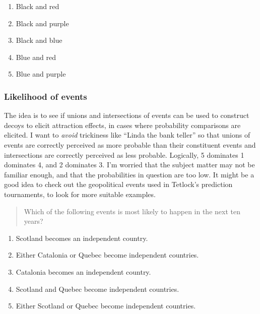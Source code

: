 \documentclass[11pt,letter]{amsart}
\begin{document}
\begin{enumerate}
\item Black and red 

\item Black and purple 

\item Black and blue 

\item Blue and red 

\item Blue and purple
\end{enumerate}

\subsubsection{Likelihood of events}

The idea is to see if unions and intersections of events can be used to
construct decoys to elicit attraction effects, in cases where probability
comparisons are elicited. I want to \emph{avoid} trickiness like ``Linda the
bank teller'' so that unions of events are correctly perceived as more
probable than their constituent events and intersections are correctly
perceived as less probable. Logically, 5 dominates 1 dominates 4, and 2
dominates 3. I'm worried that the subject matter may not be familiar enough,
and that the probabilities in question are too low. It might be a good idea
to check out the geopolitical events used in Tetlock's prediction
tournaments, to look for more suitable examples.

\begin{quotation}
Which of the following events is most likely to happen in the next ten years?
\end{quotation}

\begin{enumerate}
\item Scotland becomes an independent country. 

\item Either Catalonia or Quebec become independent countries. 

\item Catalonia becomes an independent country. 

\item Scotland and Quebec become independent countries. 

\item Either Scotland or Quebec become independent countries.
\end{enumerate}
\end{document}
